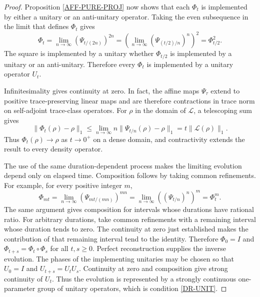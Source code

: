 \documentclass{techbrief}
\begin{document}
\begin{proof}
	Proposition \ref{AFF-PURE-PROJ} now shows that each $\Phi_t$ is implemented by either a unitary or an anti-unitary operator. Taking the even subsequence in the limit that defines $\Phi_t$ gives
	\begin{equation}
		\Phi_t
		=\lim_{n\to\infty}\left(\Psi_{t/(2n)}\right)^{2n}
		=\left(\lim_{n\to\infty}\left(\Psi_{(t/2)/n}\right)^n\right)^2
		=\Phi_{t/2}^2.
	\end{equation}
	The square is implemented by a unitary whether $\Phi_{t/2}$ is implemented by a unitary or an anti-unitary. Therefore every $\Phi_t$ is implemented by a unitary operator $U_t$.

	Infinitesimality gives continuity at zero. In fact, the affine maps $\Psi_\tau$ extend to positive trace-preserving linear maps and are therefore contractions in trace norm on self-adjoint trace-class operators. For $\rho$ in the domain of $\mathcal{L}$, a telescoping sum gives
	\begin{equation}
		\|\Phi_t(\rho)-\rho\|_1
		\leq\lim_{n\to\infty}n\|\Psi_{t/n}(\rho)-\rho\|_1
		=t\|\mathcal{L}(\rho)\|_1.
	\end{equation}
	Thus $\Phi_t(\rho)\to\rho$ as $t\to0^+$ on a dense domain, and contractivity extends the result to every density operator.

	The use of the same duration-dependent process makes the limiting evolution depend only on elapsed time. Composition follows by taking common refinements. For example, for every positive integer $m$,
	\begin{equation}
		\Phi_{mt}
		=\lim_{n\to\infty}\left(\Psi_{mt/(mn)}\right)^{mn}
		=\lim_{n\to\infty}\left(\left(\Psi_{t/n}\right)^n\right)^m
		=\Phi_t^m.
	\end{equation}
	The same argument gives composition for intervals whose durations have rational ratio. For arbitrary durations, take common refinements with a remaining interval whose duration tends to zero. The continuity at zero just established makes the contribution of that remaining interval tend to the identity. Therefore $\Phi_0=I$ and $\Phi_{t+s}=\Phi_t\circ\Phi_s$ for all $t,s\geq0$. Perfect reconstruction supplies the inverse evolution. The phases of the implementing unitaries may be chosen so that $U_0=I$ and $U_{t+s}=U_tU_s$. Continuity at zero and composition give strong continuity of $U_t$. Thus the evolution is represented by a strongly continuous one-parameter group of unitary operators, which is condition \ref{DR-UNIT}.
\end{proof}
\end{document}
